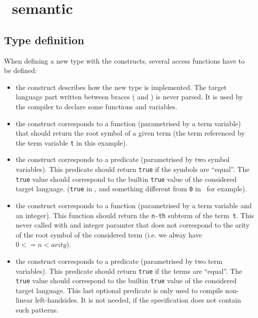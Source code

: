 \section{\TOM\ semantic}

\subsection{Type definition}\label{typedef}

\noindent
When defining a new type with the  constructs,
several access functions have to be defined:
\begin{itemize}
\item\label{implement} the  construct describes how the new type is 
  implemented. The target language part written between braces
  ( and ) is never parsed. It is used by
  the compiler to declare some functions and variables.

\item\label{getfs} the  construct corresponds to a
  function (parametrised by a term variable) that should return the
  root symbol of a given term (the term referenced by the term
  variable \texttt{t} in this example). 

\item\label{cmpfs} the  construct corresponds to a
  predicate (parametrised by two symbol variables).
  This predicate should return \texttt{true} if the symbols are
  ``equal''. The \texttt{true} value should correspond to the 
  builtin \texttt{true} value of the considered target language.
  (\texttt{true} in \Java, and something different from \texttt{0} in
  \Clang\ for example). 

\item\label{getsub} the  construct corresponds to a
  function (parametrised by a term variable and an integer).
  This function should return the \texttt{n-th} subterm of the
  term~\texttt{t}. This never called with and integer paramter that
  does not correspond to the arity of the root symbol of the
  considered term (i.e. we alway have $0 <= n < arity$).

\item\label{equals} the  construct corresponds to a
  predicate (parametrised by two term variables).
  This predicate should return \texttt{true} if the terms are
  ``equal''. The \texttt{true} value should correspond to the 
  builtin \texttt{true} value of the considered target language.
  This last optional predicate is only used to compile non-linear 
  left-handsides. It is not needed, if the specification does not
  contain such patterns.
\end{itemize}


